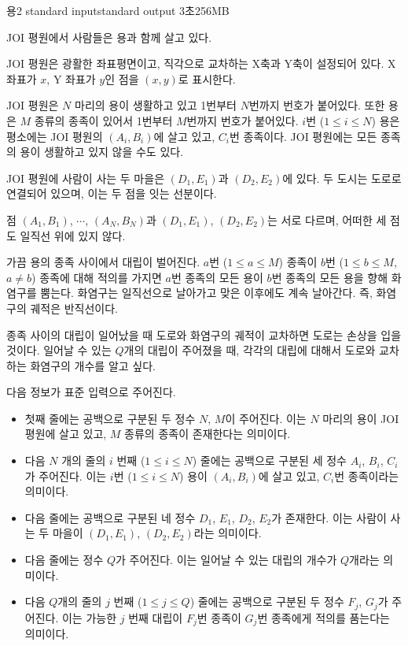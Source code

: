 \begin{problem}{용2}
	{standard input}{standard output}
	{3초}{256MB}{}
	
	JOI 평원에서 사람들은 용과 함께 살고 있다.
	
	JOI 평원은 광활한 좌표평면이고, 직각으로 교차하는 X축과 Y축이 설정되어 있다. X 좌표가 $x$, Y 좌표가 $y$인 점을 $(x, y)$로 표시한다.
	
	JOI 평원은 $N$ 마리의 용이 생활하고 있고 1번부터 $N$번까지 번호가 붙어있다. 또한 용은 $M$ 종류의 종족이 있어서 1번부터 $M$번까지 번호가 붙어있다. $i$번 ($1 \le i \le N$) 용은 평소에는 JOI 평원의 $(A_i, B_i)$에 살고 있고, $C_i$번 종족이다. JOI 평원에는 모든 종족의 용이 생활하고 있지 않을 수도 있다.
	
	JOI 평원에 사람이 사는 두 마을은 $(D_1, E_1)$과 $(D_2, E_2)$에 있다. 두 도시는 도로로 연결되어 있으며, 이는 두 점을 잇는 선분이다.
	
	점 $(A_1, B_1)$, $\cdots$, $(A_N, B_N)$과 $(D_1, E_1)$, $(D_2, E_2)$는 서로 다르며, 어떠한 세 점도 일직선 위에 있지 않다.
	
	가끔 용의 종족 사이에서 대립이 벌어진다. $a$번 ($1 \le a \le M$) 종족이 $b$번 ($1 \le b \le M$, $a \ne b$) 종족에 대해 적의를 가지면 $a$번 종족의 모든 용이 $b$번 종족의 모든 용을 향해 화염구를 뿜는다. 화염구는 일직선으로 날아가고 맞은 이후에도 계속 날아간다. 즉, 화염구의 궤적은 반직선이다.
	
	종족 사이의 대립이 일어났을 때 도로와 화염구의 궤적이 교차하면 도로는 손상을 입을 것이다. 일어날 수 있는 $Q$개의 대립이 주어졌을 때, 각각의 대립에 대해서 도로와 교차하는 화염구의 개수를 알고 싶다.
	
	\InputFile
	
	다음 정보가 표준 입력으로 주어진다.
	
	\begin{itemize}
		\item 첫째 줄에는 공백으로 구분된 두 정수 $N$, $M$이 주어진다. 이는 $N$ 마리의 용이 JOI 평원에 살고 있고, $M$ 종류의 종족이 존재한다는 의미이다.
		\item 다음 $N$ 개의 줄의 $i$ 번째 ($1 \le i \le N$) 줄에는 공백으로 구분된 세 정수 $A_i$, $B_i$, $C_i$가 주어진다. 이는 $i$번 ($1 \le i \le N$) 용이 $(A_i, B_i)$에 살고 있고, $C_i$번 종족이라는 의미이다.
		\item 다음 줄에는 공백으로 구분된 네 정수 $D_1$, $E_1$, $D_2$, $E_2$가 존재한다. 이는 사람이 사는 두 마을이 $(D_1, E_1)$, $(D_2, E_2)$라는 의미이다.
		\item 다음 줄에는 정수 $Q$가 주어진다. 이는 일어날 수 있는 대립의 개수가 $Q$개라는 의미이다.
		\item 다음 $Q$개의 줄의 $j$ 번째 ($1 \le j \le Q$) 줄에는 공백으로 구분된 두 정수 $F_j$, $G_j$가 주어진다. 이는 가능한 $j$ 번째 대립이 $F_j$번 종족이 $G_j$번 종족에게 적의를 품는다는 의미이다.
	\end{itemize}
	

\end{problem}
